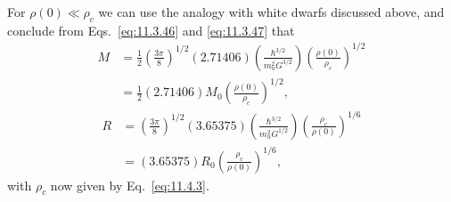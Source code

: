 For \(\rho(0)\ll\rho_c\) we can use the analogy with white dwarfs discussed
above, and conclude from Eqs.~\eqref{eq:11.3.46} and \eqref{eq:11.3.47}
that
\begin{equation}
  \begin{split}
  M
  &=
  \frac12\left(\frac{3\pi}{8}\right)^{1/2}(2.71406)
  \left(\frac{\hbar^{3/2}}{m_n^2G^{3/2}}\right)
  \left(\frac{\rho(0)}{\rho_c}\right)^{1/2}\\
  &=
  \frac12(2.71406)M_0
  \left(\frac{\rho(0)}{\rho_c}\right)^{1/2},
  \end{split}
  \tag{11.4.9}\label{eq:11.4.9}
\end{equation}
\begin{equation}
  \begin{split}
  R
  &=
  \left(\frac{3\pi}{8}\right)^{1/2}(3.65375)
  \left(\frac{\hbar^{3/2}}{m_n^2G^{1/2}}\right)
  \left(\frac{\rho_c}{\rho(0)}\right)^{1/6}\\
  &=
  (3.65375)R_0
  \left(\frac{\rho_c}{\rho(0)}\right)^{1/6},
  \end{split}
  \tag{11.4.10}\label{eq:11.4.10}
\end{equation}
with \(\rho_c\) now given by Eq.~\eqref{eq:11.4.3}.

